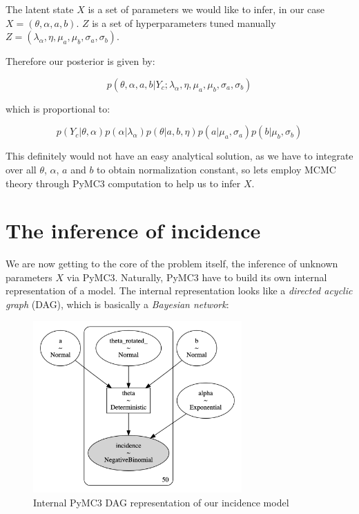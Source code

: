 \documentclass[
  digital, %
  oneside, %
  lof,     %
  lot,     %
]{fithesis4}
\begin{document}
The latent state $X$ is a set of parameters we would like
to infer, in our case $X = (\theta, \alpha, a, b)$.
$Z$ is a set of hyperparameters tuned manually 
$Z = (\lambda_\alpha, \eta, \mu_a, \mu_b, \sigma_a, \sigma_b)$.

Therefore our posterior is given by:

\begin{equation}
  p \left( \theta, \alpha, a, b | Y_c; \lambda_\alpha, \eta, \mu_a, \mu_b, \sigma_a, \sigma_b \right)
\end{equation}

which is proportional to:

\begin{equation}\label{eq:inc-model-joint-expanded}
   p( Y_c | \theta, \alpha ) p( \alpha | \lambda_\alpha ) p ( \theta | a, b, \eta ) p ( a | \mu_a, \sigma_a ) p ( b | \mu_b, \sigma_b )
\end{equation}

This definitely would not have an easy analytical solution,
as we have to integrate over all
$\theta$, $\alpha$, $a$ and $b$ to obtain normalization constant,
so lets employ MCMC theory through PyMC3 computation to
help us to infer $X$.


\section{The inference of incidence}
\label{sec:inference-of-incidence}

We are now getting to the core of the problem itself, 
the inference of unknown 
parameters $X$ via PyMC3. Naturally, PyMC3 have to build 
its own internal representation of a model.
The internal representation looks like
a \textit{directed acyclic graph} (DAG), which
is basically a \textit{Bayesian network}:

\begin{figure}[H]
  \begin{center}
    \includegraphics[width=8cm]{static/images/inc-model-graphviz.png}
  \end{center}
  \caption{Internal PyMC3 DAG representation of our incidence model}
  \label{fig:inc-model-graphviz}
\end{figure}
\end{document}
